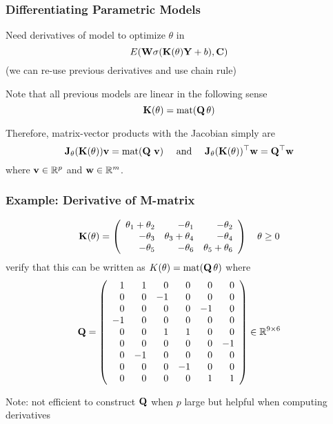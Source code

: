 \documentclass[12pt,fleqn,handout]{beamer}
\begin{document}
\begin{frame}
	\frametitle{Differentiating Parametric Models}
	Need derivatives of model to optimize $\theta$ in
	$$
		E({\bf W} \sigma({\bf K}(\theta){\bf Y}+b),{\bf C}) 
	$$
	(we can re-use previous derivatives and use chain rule)
	
	\bigskip
	\pause
	
	Note that all previous models are linear in the following sense
	$$
		{\bf K}(\theta) = {\rm mat}({\bf Q}\, \theta)
	$$
	
	\bigskip
	\pause
	
	Therefore, matrix-vector products with the Jacobian simply are
	$$
		{\bf J}_\theta ({\bf K}(\theta)) {\bf v}  = {\rm mat}({\bf Q} \ {\bf v})\quad\text{ and }\quad
		{\bf J}_\theta ({\bf K}(\theta))^\top {\bf w}  = {\bf Q}^\top {\bf w}
	$$
	where ${\bf v} \in \mathbb{R}^p$ and ${\bf w} \in \mathbb{R}^m$.
\end{frame}

\begin{frame}\frametitle{Example: Derivative of M-matrix}
	$$
	{\bf K}(\theta) = \left(
			\begin{array}{rrr}
				\theta_1+\theta_2 & -\theta_1 & -\theta_2 \\
				-\theta_3 & \theta_3 + \theta_4 & -\theta_4 \\
				-\theta_5 & -\theta_6 & \theta_5+\theta_6
			\end{array}
		\right)
		\quad \theta \geq 0
	$$
	\pause
	verify that this can be written as $K(\theta) = {\rm mat}({\bf Q} \, \theta)$ where
	$$
		{\bf Q} = \left(
			\begin{array}{rrrrrr}
				1 & 1 & 0 & 0 & 0 & 0 \\
				0 & 0 & -1& 0 & 0 & 0 \\
				0 & 0 & 0 & 0 &-1 & 0 \\
				-1& 0 & 0 & 0 & 0 & 0 \\
				0 & 0 & 1 & 1 & 0 & 0 \\
				0 & 0 & 0 & 0 & 0 &-1 \\
				0 &-1 & 0 & 0 & 0 & 0 \\
				0 & 0 & 0 & -1& 0 & 0 \\
				0 & 0 & 0 & 0 & 1 & 1
			\end{array}
		\right) \in \mathbb{R}^{9\times 6}
	$$
	\begin{center}
		Note: not efficient to construct ${\bf Q}$ when $p$ large but helpful when computing derivatives
	\end{center}
\end{frame}
\end{document}
